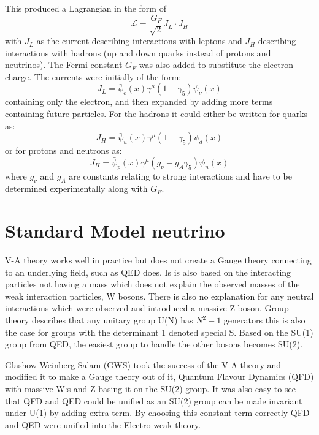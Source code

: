 This produced a Lagrangian in the form of 
\begin{equation}
\mathcal{L} = \frac{G_F}{\sqrt{2}}J_L \cdot J_H
\end{equation}
with $J_L$ as the current describing interactions with leptons and $J_H$ describing interactions with hadrons (up and down quarks instead of protons and neutrinos). The Fermi constant $G_F$ was also added to substitute the electron charge. The currents were initially of the form:
\begin{equation}
J_L = \bar{\psi}_e(x)\gamma^\mu (1-\gamma_5) \psi_\nu(x)
\end{equation}
containing only the electron, and then expanded by adding more terms containing future particles. For the hadrons it could either be written for quarks as:
\begin{equation}
J_H = \bar{\psi}_u(x)\gamma^\mu (1-\gamma_5) \psi_d(x)
\end{equation}
or for protons and neutrons as:
\begin{equation}
J_H = \bar{\psi}_p(x)\gamma^\mu (g_\nu-g_A\gamma_5) \psi_n(x)
\end{equation}
where $g_\nu$ and $g_A$ are constants relating to strong interactions and have to be determined experimentally along with $G_F$.

\pagebreak
\section{Standard Model neutrino}\label{subsection:SMN}
V-A theory works well in practice but does not create a Gauge theory connecting to an underlying field, such as QED does. Is is also based on the interacting particles not having a mass which does not explain the observed masses of the weak interaction particles, W bosons. There is also no explanation for any neutral interactions which were observed and introduced a massive Z boson. Group theory describes that any unitary group U(N) has $N^2 -1$ generators this is also the case for groups with the determinant 1 denoted special S. Based on the SU(1) group from QED, the easiest group to handle the other bosons becomes SU(2). 

Glashow-Weinberg-Salam (GWS) took the success of the V-A theory and modified it to make a Gauge theory out of it, Quantum Flavour Dynamics (QFD) with  massive W:s and Z basing it on the SU(2) group. It was also easy to see that QFD and QED could be unified as an SU(2) group can be made invariant under U(1) by adding extra term. By choosing this constant term correctly QFD and QED were unified into the Electro-weak theory.

